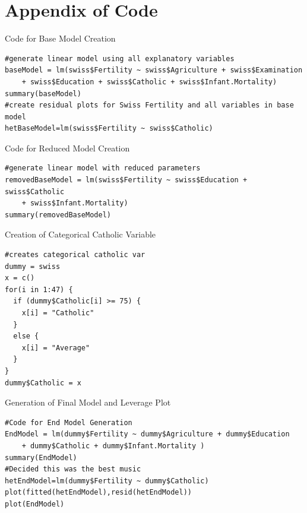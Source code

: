 \documentclass[preprint,12pt]{elsarticle}
\begin{document}
\section*{Appendix of Code}

\noindent [1] Code for Base Model Creation
\begin{verbatim}
#generate linear model using all explanatory variables
baseModel = lm(swiss$Fertility ~ swiss$Agriculture + swiss$Examination 
    + swiss$Education + swiss$Catholic + swiss$Infant.Mortality)
summary(baseModel)
#create residual plots for Swiss Fertility and all variables in base model
hetBaseModel=lm(swiss$Fertility ~ swiss$Catholic)
\end{verbatim}

\noindent [2] Code for Reduced Model Creation
\begin{verbatim}
#generate linear model with reduced parameters
removedBaseModel = lm(swiss$Fertility ~ swiss$Education + swiss$Catholic 
    + swiss$Infant.Mortality)
summary(removedBaseModel)
\end{verbatim}

\noindent [3] Creation of Categorical Catholic Variable
\begin{verbatim}
#creates categorical catholic var
dummy = swiss
x = c()
for(i in 1:47) {
  if (dummy$Catholic[i] >= 75) {
    x[i] = "Catholic"
  }
  else {
    x[i] = "Average"
  }
}
dummy$Catholic = x
\end{verbatim}

\noindent [4] Generation of Final Model and Leverage Plot
\begin{verbatim}
#Code for End Model Generation
EndModel = lm(dummy$Fertility ~ dummy$Agriculture + dummy$Education 
    + dummy$Catholic + dummy$Infant.Mortality )
summary(EndModel)
#Decided this was the best music
hetEndModel=lm(dummy$Fertility ~ dummy$Catholic)
plot(fitted(hetEndModel),resid(hetEndModel))
plot(EndModel)
\end{verbatim}
\end{document}
